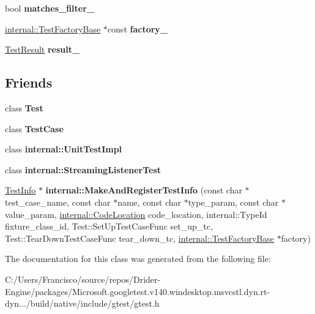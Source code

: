 \begin{DoxyCompactItemize}
bool {\bfseries matches\+\_\+filter\+\_\+}
\item 
\mbox{\label{classtesting_1_1_test_info_a6bf2422602b877c73f6eb169a63cfea8}} 
\hyperlink{classtesting_1_1internal_1_1_test_factory_base}{internal\+::\+Test\+Factory\+Base} $\ast$const {\bfseries factory\+\_\+}
\item 
\mbox{\label{classtesting_1_1_test_info_a108fd469897a8d4e5c4361947a5ed785}} 
\hyperlink{classtesting_1_1_test_result}{Test\+Result} {\bfseries result\+\_\+}
\end{DoxyCompactItemize}
\subsection*{Friends}
\begin{DoxyCompactItemize}
\item 
\mbox{\label{classtesting_1_1_test_info_a5b78b1c2e1fa07ffed92da365593eaa4}} 
class {\bfseries Test}
\item 
\mbox{\label{classtesting_1_1_test_info_aff779e55b06adfa7c0088bd10253f0f0}} 
class {\bfseries Test\+Case}
\item 
\mbox{\label{classtesting_1_1_test_info_acc0a5e7573fd6ae7ad1878613bb86853}} 
class {\bfseries internal\+::\+Unit\+Test\+Impl}
\item 
\mbox{\label{classtesting_1_1_test_info_adc037d188dab349a94868991955c9cd4}} 
class {\bfseries internal\+::\+Streaming\+Listener\+Test}
\item 
\mbox{\label{classtesting_1_1_test_info_a70ddf8a12d8c05f17429f6381abc8ace}} 
\hyperlink{classtesting_1_1_test_info}{Test\+Info} $\ast$ {\bfseries internal\+::\+Make\+And\+Register\+Test\+Info} (const char $\ast$test\+\_\+case\+\_\+name, const char $\ast$name, const char $\ast$type\+\_\+param, const char $\ast$value\+\_\+param, \hyperlink{structtesting_1_1internal_1_1_code_location}{internal\+::\+Code\+Location} code\+\_\+location, internal\+::\+Type\+Id fixture\+\_\+class\+\_\+id, Test\+::\+Set\+Up\+Test\+Case\+Func set\+\_\+up\+\_\+tc, Test\+::\+Tear\+Down\+Test\+Case\+Func tear\+\_\+down\+\_\+tc, \hyperlink{classtesting_1_1internal_1_1_test_factory_base}{internal\+::\+Test\+Factory\+Base} $\ast$factory)
\end{DoxyCompactItemize}


The documentation for this class was generated from the following file\+:\begin{DoxyCompactItemize}
\item 
C\+:/\+Users/\+Francisco/source/repos/\+Drider-\/\+Engine/packages/\+Microsoft.\+googletest.\+v140.\+windesktop.\+msvcstl.\+dyn.\+rt-\/dyn.../build/native/include/gtest/gtest.\+h\end{DoxyCompactItemize}
